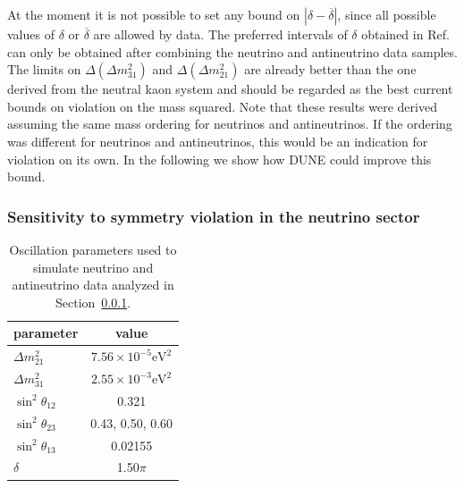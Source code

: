 At the moment it is not possible to set any bound on $|\delta-\overline{\delta}|$, since all possible values of
$\delta$ or $\overline{\delta}$ are allowed by data. The preferred intervals of $\delta$ obtained in Ref.~\cite{deSalas:2017kay} can only be obtained after combining the neutrino and antineutrino data samples. 
The limits  on $\Delta(\Delta m_{31}^2)$ and $\Delta(\Delta m_{21}^2)$  are already better than the one derived from the neutral kaon system and should be regarded as the best current bounds on  violation on the mass squared. %
Note that these results were derived assuming the same mass ordering for neutrinos and antineutrinos. If the ordering was different for neutrinos and antineutrinos, this would be an indication for  violation on its own. In the following we show how DUNE could improve this bound.

\subsubsection{Sensitivity to  symmetry violation in the neutrino sector}
\label{sec:sensitivity}

\begin{table}[htb]\centering
\caption[Oscillation parameters used to simulate neutrino and antineutrino data]{Oscillation parameters used to simulate neutrino and antineutrino data analyzed in Section~\ref{sec:sensitivity}.}
     \label{tab:par2}
   \begin{tabular}{lc}
    \hline
    parameter & value 
    \\
    \hline
    $\Delta m^2_{21}$& $7.56\times 10^{-5}\text{eV}^2$\\  
    $\Delta m^2_{31}$&  $2.55\times 10^{-3}\text{eV}^2$\\
    $\sin^2\theta_{12}$ & 0.321\\ 
     $\sin^2\theta_{23}$ &  0.43, 0.50, 0.60\\
    $\sin^2\theta_{13}$ & 0.02155\\
   $\delta$ & 1.50$\pi$\\
       \hline
 
     \end{tabular}
\end{table}

